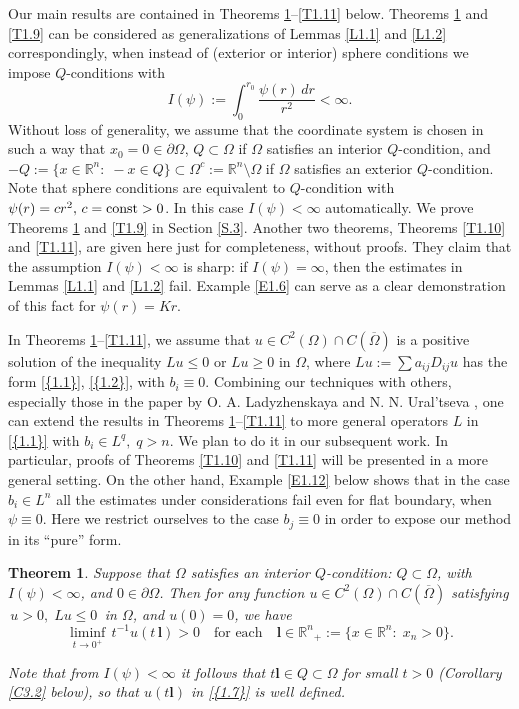 \documentclass[regno,12pt]{amsart}
\newtheorem{theorem}{Theorem}[section]
\theoremstyle{definition}
\theoremstyle{remark}
\begin{document}
Our main results are contained in Theorems \ref{T1.8}--\ref{T1.11} below. Theorems \ref{T1.8} and \ref{T1.9} can be considered as generalizations of Lemmas \ref{L1.1} and \ref{L1.2} correspondingly, when instead of (exterior or interior) sphere conditions we impose $Q$-conditions with
    \begin{equation}\label{1.6}
        I(\psi):=\int_0^{r_0}\frac{\psi(r)\,dr}{r^2}<{\infty}.
    \end{equation}
Without loss of generality, we assume that the coordinate system is chosen in such a way that $x_0=0\in{\partial\Omega}$, $Q{\subset}\Omega$ if $\Omega$ satisfies an interior $Q$-condition, and $-Q:=\{x\in{{\mathbb R}^n}:\; -x\in Q\}{\subset} \Omega^c:={{\mathbb R}^n}{\setminus} \Omega$ if $\Omega$ satisfies an exterior $Q$-condition. Note that sphere conditions are equivalent to $Q$-condition with $\psi(r)=cr^2,\,c={{\rm const}}>0$. In this case $I(\psi)<{\infty}$ automatically. We prove Theorems \ref{T1.8} and \ref{T1.9} in Section \ref{S.3}. Another two theorems, Theorems \ref{T1.10} and \ref{T1.11},  are given here just for completeness, without proofs. They claim that the assumption $I(\psi)<{\infty}$ is sharp: if $I(\psi)={\infty}$, then the estimates in Lemmas \ref{L1.1} and \ref{L1.2} fail. Example \ref{E1.6} can serve as a clear demonstration of this fact for $\psi(r)=Kr$.

In Theorems \ref{T1.8}--\ref{T1.11}, we assume that $u\in C^2(\Omega)\cap C({\overline{\Omega}})$ is a positive solution of the inequality $Lu\le 0$ or $Lu\ge 0$ in $\Omega$, where $Lu:=\sum a_{ij}D_{ij}u$ has the form {\eqref{{1.1}}}, {\eqref{{1.2}}}, with $b_i{\equiv} 0$. Combining our techniques with others, especially those in the paper by O. A. Ladyzhenskaya and N. N. Ural'tseva \cite{LU88}, one can extend the results in Theorems \ref{T1.8}--\ref{T1.11} to more general operators $L$ in {\eqref{{1.1}}} with $b_i\in L^q,\;q>n$. We plan to do it in our subsequent work. In particular, proofs of Theorems \ref{T1.10} and \ref{T1.11} will be presented in a more general setting. On the other hand, Example \ref{E1.12} below shows that in the case $b_i\in L^n$ all the estimates under considerations fail even for flat boundary, when $\psi{\equiv} 0$.
Here we restrict ourselves to the case $b_j{\equiv} 0$ in order to expose our method in its ``pure'' form.

\begin{theorem}\label{T1.8}
    Suppose that $\Omega$ satisfies an interior $Q$-condition: $Q{\subset}\Omega$, with $I(\psi)<{\infty}$, and $0\in{\partial\Omega}$.  Then for any function $u\in C^2(\Omega)\cap C({\overline{\Omega}})$ satisfying $\,u>0,\;Lu\le 0\,$ in $\Omega$, and $u(0)=0$, we have
     \begin{equation}\label{1.7}
        \liminf_{t\to 0^+}\, t^{-1} u(t\,{\bm{{l}}})>0
        {\quad\text{{for each}}\quad} {\bm{{l}}}\in
        {{\mathbb R}^n}_+:=\{x\in{{\mathbb R}^n}:\;x_n>0\}.
    \end{equation}

     Note that from $I(\psi)<{\infty}$ it follows that $t{\bm{{l}}}\in Q{\subset}\Omega$ for small $t>0$ (Corollary \ref{C3.2} below), so that $u(t{\bm{{l}}})$ in {\eqref{{1.7}}} is well defined.
\end{theorem}
\end{document}
